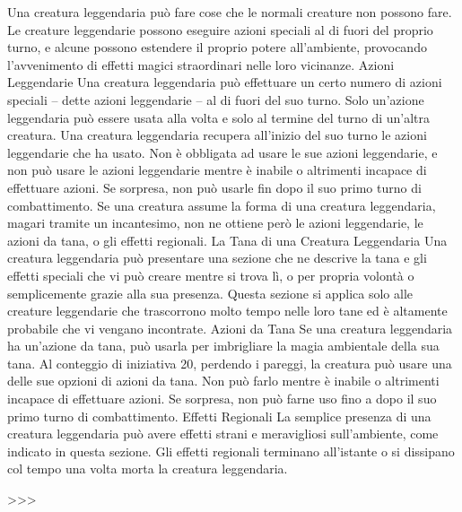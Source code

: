 \begin{multicols}{2}
Una creatura leggendaria può fare cose che le normali
creature non possono fare. Le creature leggendarie
possono eseguire azioni speciali al di fuori del proprio
turno, e alcune possono estendere il proprio potere
all’ambiente, provocando l’avvenimento di effetti magici
straordinari nelle loro vicinanze.
Azioni Leggendarie
Una creatura leggendaria può effettuare un certo
numero di azioni speciali – dette azioni leggendarie – al
di fuori del suo turno. Solo un’azione leggendaria può
essere usata alla volta e solo al termine del turno di
un’altra creatura. Una creatura leggendaria recupera
all’inizio del suo turno le azioni leggendarie che ha
usato. Non è obbligata ad usare le sue azioni
leggendarie, e non può usare le azioni leggendarie
mentre è inabile o altrimenti incapace di effettuare
azioni. Se sorpresa, non può usarle fin dopo il suo
primo turno di combattimento.
Se una creatura assume la forma di una creatura
leggendaria, magari tramite un incantesimo, non ne
ottiene però le azioni leggendarie, le azioni da tana, o
gli effetti regionali.
La Tana di una Creatura
Leggendaria
Una creatura leggendaria può presentare una sezione
che ne descrive la tana e gli effetti speciali che vi può
creare mentre si trova lì, o per propria volontà o
semplicemente grazie alla sua presenza. Questa
sezione si applica solo alle creature leggendarie che
trascorrono molto tempo nelle loro tane ed è altamente
probabile che vi vengano incontrate.
Azioni da Tana
Se una creatura leggendaria ha un’azione da tana, può
usarla per imbrigliare la magia ambientale della sua
tana. Al conteggio di iniziativa 20, perdendo i pareggi,
la creatura può usare una delle sue opzioni di azioni da
tana. Non può farlo mentre è inabile o altrimenti
incapace di effettuare azioni. Se sorpresa, non può
farne uso fino a dopo il suo primo turno di
combattimento.
Effetti Regionali
La semplice presenza di una creatura leggendaria può
avere effetti strani e meravigliosi sull’ambiente, come
indicato in questa sezione. Gli effetti regionali
terminano all’istante o si dissipano col tempo una volta
morta la creatura leggendaria.

>>>


\end{multicols}
